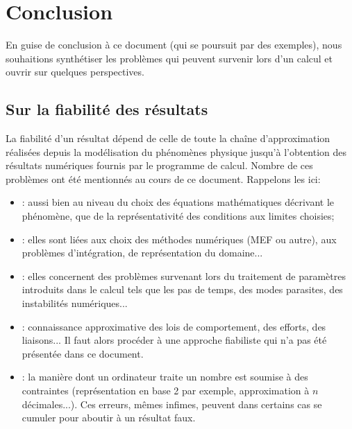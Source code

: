 \chapter*{Conclusion}\label{Ch-Ccl}


En guise de conclusion à ce document (qui se poursuit par des exemples), nous souhaitions synthétiser
les problèmes qui peuvent survenir lors d'un calcul et ouvrir sur quelques perspectives.



\medskip
\section*{Sur la fiabilité des résultats}

La fiabilité d'un résultat dépend de celle de toute la chaîne d'approximation réalisées depuis la modélisation
du phénomènes physique jusqu'à l'obtention des résultats numériques fournis par le programme de calcul.
Nombre de ces problèmes ont été mentionnés au cours de ce document. Rappelons les ici:
\begin{itemize}
   \item {}: aussi bien au niveau du choix des équations mathématiques décrivant le phénomène, 
	que de la représentativité des conditions aux limites choisies;
   \item {}: elles sont liées aux choix des méthodes numériques (MEF ou autre), aux problèmes
	d'intégration, de représentation du domaine...
   \item {}: elles concernent des problèmes survenant lors du traitement de paramètres
	introduits dans le calcul tels que les pas de temps, des modes parasites, des instabilités numériques...
   \item {}: connaissance approximative des lois de comportement, des efforts,
	des liaisons... Il faut alors procéder à une approche fiabiliste qui n'a pas été présentée dans ce document.
   \item {}: la manière dont un ordinateur traite un nombre est soumise à des contraintes
	(représentation en base 2 par exemple, approximation à $n$ décimales...). Ces erreurs, mêmes infimes, peuvent
	dans certains cas se cumuler pour aboutir à un résultat faux.
\end{itemize}

